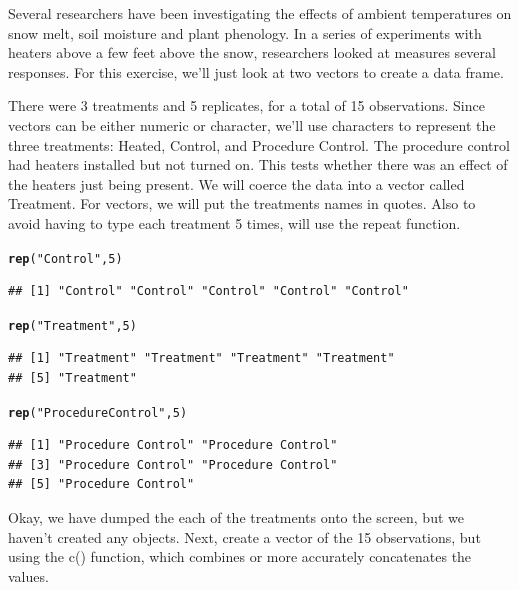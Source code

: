 \documentclass{tufte-handout}\usepackage[]{graphicx}\usepackage[]{xcolor}
\makeatletter
\newcommand{\hlnum}[1]{\textcolor[rgb]{0.686,0.059,0.569}{#1}}%
\newcommand{\hlstr}[1]{\textcolor[rgb]{0.192,0.494,0.8}{#1}}%
\newcommand{\hlstd}[1]{\textcolor[rgb]{0.345,0.345,0.345}{#1}}%
\newcommand{\hlkwd}[1]{\textcolor[rgb]{0.737,0.353,0.396}{\textbf{#1}}}%
\newenvironment{kframe}{%
 \def\at@end@of@kframe{}%
 \ifinner\ifhmode%
  \def\at@end@of@kframe{\end{minipage}}%
  \begin{minipage}{\columnwidth}%
 \fi\fi%
 \def\FrameCommand##1{\hskip\@totalleftmargin \hskip-\fboxsep
 \colorbox{shadecolor}{##1}\hskip-\fboxsep
     \hskip-\linewidth \hskip-\@totalleftmargin \hskip\columnwidth}%
 \MakeFramed {\advance\hsize-\width
   \@totalleftmargin\z@ \linewidth\hsize
   \@setminipage}}%
 {\par\unskip\endMakeFramed%
 \at@end@of@kframe}
\newenvironment{knitrout}{}{} %
\makeatother
\begin{document}
Several researchers have been investigating the effects of ambient temperatures on snow melt, soil moisture and plant phenology. In a series of experiments with heaters above a few feet above the snow, researchers looked at measures several responses. For this exercise, we'll just look at two vectors to create a data frame.

There were 3 treatments and 5 replicates, for a total of 15 observations. Since vectors can be either numeric or character, we'll use characters to represent the three treatments: Heated, Control, and Procedure Control. The procedure control had heaters installed but not turned on. This tests whether there was an effect of the heaters just being present. We will coerce the data into a vector called Treatment.
For vectors, we will put the treatments names in quotes. Also to avoid having to type each treatment 5 times, will use the repeat function.


\begin{knitrout}
\color{fgcolor}\begin{kframe}
\begin{alltt}
\hlkwd{rep}\hlstd{(}\hlstr{"Control"}\hlstd{,} \hlnum{5}\hlstd{)}
\end{alltt}
\begin{verbatim}
## [1] "Control" "Control" "Control" "Control" "Control"
\end{verbatim}
\begin{alltt}
\hlkwd{rep}\hlstd{(}\hlstr{"Treatment"}\hlstd{,} \hlnum{5}\hlstd{)}
\end{alltt}
\begin{verbatim}
## [1] "Treatment" "Treatment" "Treatment" "Treatment"
## [5] "Treatment"
\end{verbatim}
\begin{alltt}
\hlkwd{rep}\hlstd{(}\hlstr{"Procedure Control"}\hlstd{,} \hlnum{5}\hlstd{)}
\end{alltt}
\begin{verbatim}
## [1] "Procedure Control" "Procedure Control"
## [3] "Procedure Control" "Procedure Control"
## [5] "Procedure Control"
\end{verbatim}
\end{kframe}
\end{knitrout}


Okay, we have dumped the each of the treatments onto the screen, but we haven't created any objects. Next, create a vector of the 15 observations, but using the c() function, which combines or more accurately concatenates the values. 
\end{document}
